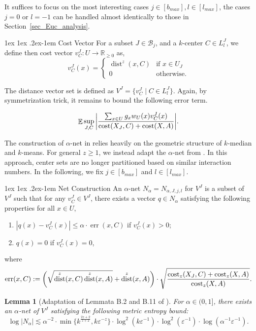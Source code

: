 \documentclass[11pt,letterpaper]{article}
\makeatletter
\renewcommand{\paragraph}{%
  \@startsection{paragraph}{4}%
  {\z@}{1ex \@plus 1ex \@minus .2ex}{-1em}%
  {\normalfont\normalsize\bfseries}%
}
\newtheorem{lemma}[theorem]{Lemma}
\theoremstyle{definition}
\newcommand{\eps}{\varepsilon}
\DeclareMathOperator*{\E}{\ensuremath{\mathbb{E}}}
\DeclareMathOperator{\dist}{dist}
\makeatother
\begin{document}
It suffices to focus on the most interesting cases $j\in [b_{max}],l\in [l_{max}]$, the cases $j=0$ or $l=-1$ can be handled almost identically to those in Section~\ref{sec_Euc_analysis}.

\paragraph{Cost Vector} For a subset $J\in \mathcal{B}_j$, and a $k$-center $C\in L_{l}^J$, we define then cost vector $v_C^J:U\rightarrow \mathbb{R}_{\geq 0}$ as,
$$
v_C^J(x)=
\begin{cases}
\dist^z(x,C) & \text{if }x\in U_J\\
0 & \text{otherwise}.
\end{cases}
$$



The distance vector set is defined as $V^J=\{v_C^J\mid C\in L_{l}^J\}$. Again, by symmetrization trick, it remains to bound the following error term.

$$
\E\sup_{J,C}\bigg|\frac{\sum_{x\in U} g_x w_U(x)v_C^J(x)}{\cost(X_J,C)+\cost(X,A)}\bigg|.
$$

The construction of $\alpha$-net in \cite{bansal2024sensitivity} relies heavily on the geometric structure of $k$-median and $k$-means. For general $z\geq 1$, we instead adapt the $\alpha$-net from \cite{huang2024optimal}. In this approach, center sets are no longer partitioned based on similar interaction numbers. In the following, we fix $j\in [b_{max}]$ and $l\in [l_{max}]$.

\paragraph{Net Construction} An $\alpha$-net $N_{\alpha}=N_{\alpha,J,j,l}$ for $V^J$ is a subset of $V^J$ such that for any $v_C^J\in V^J$, there exists a vector $q\in N_{\alpha}$ satisfying the following properties for all $x\in U$,
\begin{enumerate}[itemsep = 0pt]
\item $|q(x)-v_C^J(x)|\leq \alpha \cdot \operatorname{err}(x,C)$ if $v_C^J(x)>0$;
\item $q(x)=0$ if $v_C^J(x)=0$,
\end{enumerate}
where
\[
\operatorname{err}(x,C) := \left(\sqrt{\dist^z(x,C)\dist^z(x,A)} + \dist^z(x,A)\right)\cdot \sqrt{\frac{\cost_z(X_J,C)+\cost_z(X,A)}{\cost_z(X,A)}}.
\]

\begin{lemma}[Adaptation of Lemmata B.2 and B.11 of \cite{huang2024optimal}] \label{Lemma_Euc_net_z}
For $\alpha\in (0,1]$, there exists an $\alpha$-net of $V^J$ satisfying the following metric entropy bound:
\[
\log |N_{\alpha}|\lesssim \alpha^{-2} \cdot \min\{k^\frac{2z+2}{z+2},k\eps^{-z}\}\cdot \log^2(k\eps^{-1})\cdot \log^2(\eps^{-1}) \cdot \log (\alpha^{-1}\eps^{-1}).
\]
\end{lemma}
\end{document}
